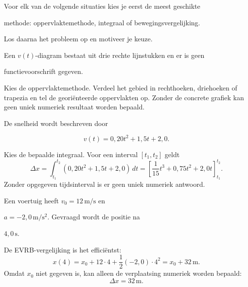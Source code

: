\documentclass{ximera}
\begin{document}
\begin{oefening}{\oefG}

Voor elk van de volgende situaties kies je eerst de meest geschikte

methode: oppervlaktemethode, integraal of bewegingsvergelijking.

Los daarna het probleem op en motiveer je keuze.

\begin{question}

Een $v(t)$-diagram bestaat uit drie rechte lijnstukken en er is geen

functievoorschrift gegeven.

\begin{oplossing}
Kies de oppervlaktemethode. Verdeel het gebied in rechthoeken, driehoeken of trapezia en tel de georiënteerde oppervlakten op. Zonder de concrete grafiek kan geen uniek numeriek resultaat worden bepaald.
\end{oplossing}

\end{question}

\begin{question}

De snelheid wordt beschreven door

\[v(t)=0,20t^2+1,5t+2,0.\]

\begin{oplossing}
Kies de bepaalde integraal. Voor een interval \([t_1,t_2]\) geldt
\[\Delta x=\int_{t_1}^{t_2}(0,20t^2+1,5t+2,0)\,dt =\left[\frac1{15}t^3+0,75t^2+2,0t\right]_{t_1}^{t_2}.\]
Zonder opgegeven tijdsinterval is er geen uniek numeriek antwoord.
\end{oplossing}

\end{question}

\begin{question}

Een voertuig heeft $v_0=12\,\mathrm{m/s}$ en

$a=-2,0\,\mathrm{m/s^2}$. Gevraagd wordt de positie na

$4,0\,\mathrm{s}$.

\begin{oplossing}
De EVRB-vergelijking is het efficiëntst:
\[x(4)=x_0+12\cdot4+\frac12(-2,0)\cdot4^2=x_0+32\,\mathrm{m}.\]
Omdat \(x_0\) niet gegeven is, kan alleen de verplaatsing numeriek worden bepaald:
\[\Delta x=32\,\mathrm{m}.\]
\end{oplossing}


\end{question}
\end{oefening}
\end{document}
